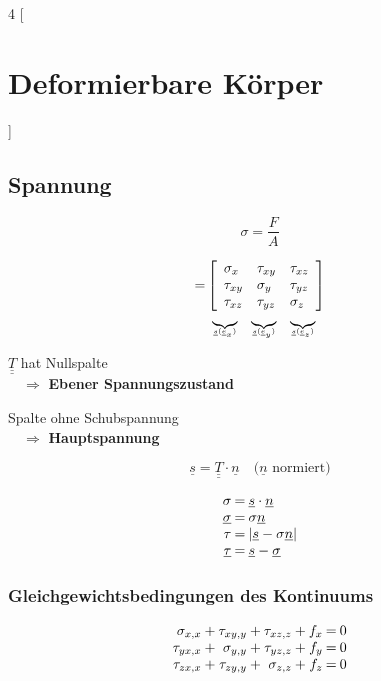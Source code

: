 \documentclass{article}
\begin{document}
	\begin{multicols*}{4}
		[\section{Deformierbare Körper}] %
			\subsection{Spannung} %
				\[
					\sigma = \frac{F}{A}
				\]
				
				\begin{align*}
					[T] =& \left[\begin{array}{lll}
						\sigma_x & \tau_{xy} & \tau_{xz} \\
						\tau_{xy} & \sigma_y & \tau_{yz} \\
						\tau_{xz} & \tau_{yz} & \sigma_z
					\end{array}\right] \\
					& \mbox{\tiny $\begin{array}{ccc}
						\underbrace{ } & \underbrace{ } & \underbrace{ }  \\
						\underline{s}(\underline{e}_x) & \underline{s}(\underline{e}_y) & \underline{s}(\underline{e}_z)
					\end{array}$}
				\end{align*}
				
				$\underline{\underline{T}}$ hat Nullspalte \\
				$\quad \Rightarrow$ \textbf{Ebener Spannungszustand}
				
				Spalte ohne Schubspannung \\
				$\quad \Rightarrow$ \textbf{Hauptspannung}
				
				\[
					\underline{s} = \underline{\underline{T}} \cdot \underline{n} \quad \text{(} \underline{n} \text{ normiert)}
				\]
				
				\[
					\begin{array}{r@{\:=\:}l}
						\sigma & \underline{s} \cdot \underline{n} \\
						\underline{\sigma} & \sigma \underline{n} \\
						\tau & |\underline{s} - \sigma \underline{n}| \\
						\underline{\tau} & \underline{s} - \underline{\sigma}
					\end{array}
				\]
				\subsubsection{Gleichgewichtsbedingungen des Kontinuums} %
					\[
						\begin{array}{r@{\:+\:}r@{\:+\:}r@{\:+\:}r@{\:=\:}l}
							\sigma_{x,x} & \tau_{xy,y}  & \tau_{xz,z}  & f_x & 0 \\
							\tau_{yx,x}  & \sigma_{y,y} & \tau_{yz,z}  & f_y & 0 \\
							\tau_{zx,x}  & \tau_{zy,y}  & \sigma_{z,z} & f_z & 0
						\end{array}
					\]

\end{multicols*}
\end{document}
